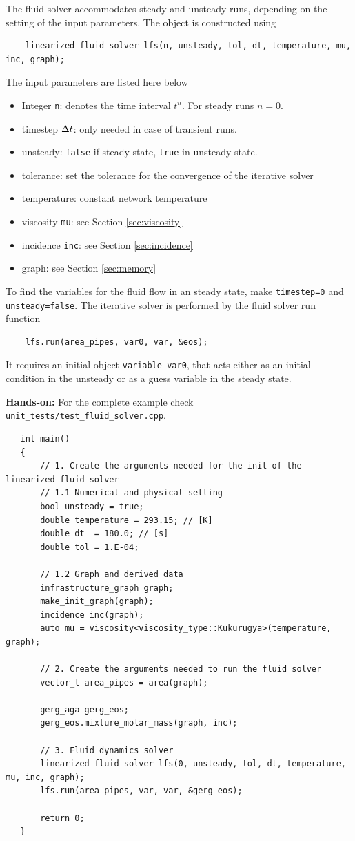 The fluid solver accommodates steady and unsteady runs, depending on the setting of the input parameters. The object is constructed using
\begin{verbatim}
    linearized_fluid_solver lfs(n, unsteady, tol, dt, temperature, mu, inc, graph);
\end{verbatim}
The input parameters are listed here below
\begin{itemize}
    \item Integer \texttt{n}: denotes the time interval $t^n$. For steady runs $n=0$.
    \item timestep $\Delta t$: only needed in case of transient runs.
    \item unsteady: \texttt{false} if steady state, \texttt{true} in unsteady state. 
    \item tolerance: set the tolerance for the convergence of the iterative solver
    \item temperature: constant network temperature
    \item viscosity \texttt{mu}: see Section \ref{sec:viscosity}
    \item incidence \texttt{inc}: see Section \ref{sec:incidence}
    \item graph: see Section \ref{sec:memory}
\end{itemize} 
To find the variables for the fluid flow in an steady state, make \texttt{timestep=0} and \texttt{unsteady=false}. 
The iterative solver is performed by the fluid solver run function
\begin{verbatim}
    lfs.run(area_pipes, var0, var, &eos);
\end{verbatim}
It requires an initial object \texttt{variable var0},  that acts either as an initial condition in the unsteady or as a guess variable  in the steady state.

\textbf{Hands-on:}
For the complete example check \texttt{unit\_tests/test\_fluid\_solver.cpp}.    

\begin{verbatim}
   int main()
   {
       // 1. Create the arguments needed for the init of the linearized fluid solver
       // 1.1 Numerical and physical setting
       bool unsteady = true;
       double temperature = 293.15; // [K]
       double dt  = 180.0; // [s]
       double tol = 1.E-04; 
       
       // 1.2 Graph and derived data
       infrastructure_graph graph;
       make_init_graph(graph);
       incidence inc(graph);
       auto mu = viscosity<viscosity_type::Kukurugya>(temperature, graph); 

       // 2. Create the arguments needed to run the fluid solver
       vector_t area_pipes = area(graph);
    
       gerg_aga gerg_eos; 
       gerg_eos.mixture_molar_mass(graph, inc);
        
       // 3. Fluid dynamics solver
       linearized_fluid_solver lfs(0, unsteady, tol, dt, temperature, mu, inc, graph);
       lfs.run(area_pipes, var, var, &gerg_eos);
    
       return 0;
   }
\end{verbatim}

